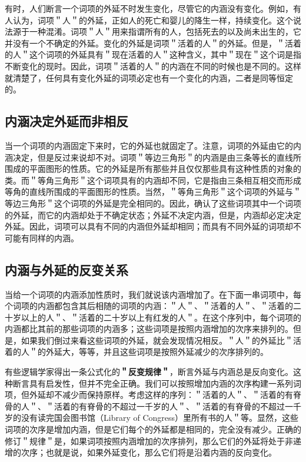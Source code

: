 有时，人们断言一个词项的外延不时发生变化，尽管它的内涵没有变化。例如，有人认为，词项＂人＂的外延，正如人的死亡和婴儿的降生一样，持续变化。这个说法源于一种混淆。词项＂人＂用来指谓所有的人，包括死去的以及尚未出生的，它并没有一个不确定的外延。变化的外延是词项＂活着的人＂的外延。但是，＂活着的人＂这个词项的外延具有＂现在活着的人＂这种含义，其中＂现在＂这个词是指不断变化的现时。因此，词项＂活着的人＂的内涵在不同的时候也是不同的。这样就清楚了，任何具有变化外延的词项必定也有一个变化的内涵，二者是同等恒定的。

\subsection{内涵决定外延而非相反}

当一个词项的内涵固定下来时，它的外延也就固定了。注意，词项的外延由它的内涵决定，但是反过来说却不对。词项＂等边三角形＂的内涵是由三条等长的直线所围成的平面图形的性质。它的外延是所有那些并且仅仅那些具有这种性质的对象的类。而＂等角三角形＂这个词项具有的内涵却不同，它是指由三条相互相交而形成等角的直线所围成的平面图形的性质。当然，＂等角三角形＂这个词项的外延与＂等边三角形＂这个词项的外延是完全相同的。因此，确认了这些词项其中一个词项的外延，而它的内涵却处于不确定状态；外延不决定内涵，但是，内涵却必定决定外延。因此，词项可以具有不同的内涵但外延却相同；而具有不同外延的词项却不可能有同样的内涵。

\subsection{内涵与外延的反变关系}

当给一个词项的内涵添加性质时，我们就说该内涵增加了。在下面一串词项中，每个词项的内涵都包含其后相随的词项的内涵：＂人＂、＂活着的人＂、＂活着的二十岁以上的人＂、＂活着的二十岁以上有红发的人＂。在这个序列中，每个词项的内涵都比其前的那些词项的内涵多；这些词项是按照内涵增加的次序来排列的。但是，如果我们倒过来看这些词项的外延，就会发现情况相反。＂人＂的外延比＂活着的人＂的外延大，等等，并且这些词项是按照外延减少的次序排列的。

有些逻辑学家得出一条公式化的\textbf{＂反变规律＂}，断言外延与内涵总是反向变化。这种断言具有启发性，但并不完全正确。我们可以按照增加内涵的次序构建一系列词项，但外延却不减少而保持原样。考虑这样的序列：＂活着的人＂、＂活着的有脊骨的人＂、＂活着的有脊骨的不超过一千岁的人＂、＂活着的有脊骨的不超过一千岁的没有读完国会图书馆（Library of Congress）里所有书的人＂等。显然，这些词项的次序是增加内涵，但是它们每个的外延都是相同的，完全没有减少。正确的修订＂规律＂是，如果词项按照内涵增加的次序排列，那么它们的外延将处于非递增的次序；也就是说，如果外延变化，那么它们将是沿着内涵的反向变化。

